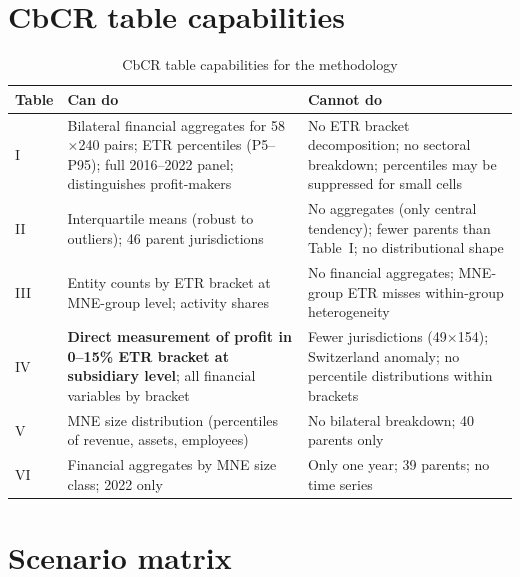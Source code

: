 \documentclass[11pt,a4paper]{article}
\begin{document}
\newpage
\section{CbCR table capabilities}\label{app:cbcr_tables}
\setcounter{table}{0}

\begin{table}[H]
\centering
\caption{CbCR table capabilities for the methodology}
\label{tab:capabilities}
\small
\begin{tabular}{@{}lp{5.5cm}p{5.5cm}@{}}
\toprule
Table & Can do & Cannot do \\
\midrule
I & Bilateral financial aggregates for 58$\times$240 pairs; ETR percentiles (P5--P95); full 2016--2022 panel; distinguishes profit-makers & No ETR bracket decomposition; no sectoral breakdown; percentiles may be suppressed for small cells \\
II & Interquartile means (robust to outliers); 46 parent jurisdictions & No aggregates (only central tendency); fewer parents than Table~I; no distributional shape \\
III & Entity counts by ETR bracket at MNE-group level; activity shares & No financial aggregates; MNE-group ETR misses within-group heterogeneity \\
IV & \textbf{Direct measurement of profit in 0--15\% ETR bracket at subsidiary level}; all financial variables by bracket & Fewer jurisdictions (49$\times$154); Switzerland anomaly; no percentile distributions within brackets \\
V & MNE size distribution (percentiles of revenue, assets, employees) & No bilateral breakdown; 40 parents only \\
VI & Financial aggregates by MNE size class; 2022 only & Only one year; 39 parents; no time series \\
\bottomrule
\end{tabular}
\end{table}


\newpage
\section{Scenario matrix}\label{app:scenarios}
\setcounter{table}{0}
\end{document}
